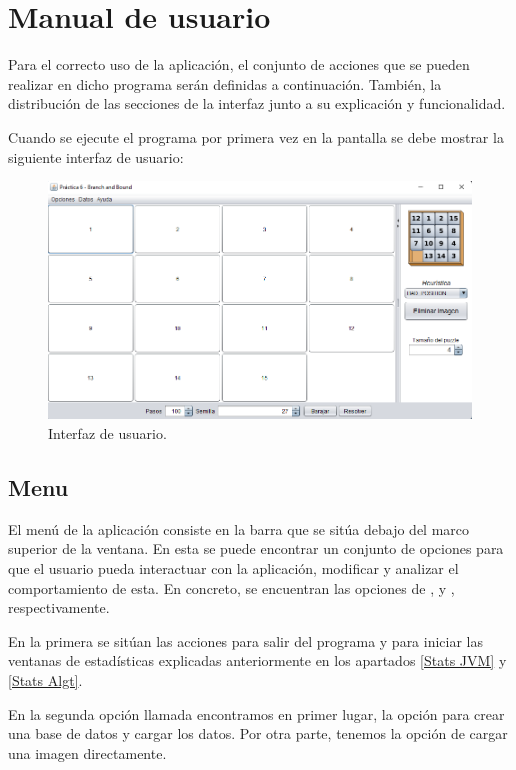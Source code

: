 \section{Manual de usuario}\label{Manual usuario}

Para el correcto uso de la aplicación, el conjunto de acciones que se pueden realizar en dicho programa serán definidas a continuación. También, la distribución de las secciones de la interfaz junto a su explicación y funcionalidad.\bigskip

Cuando se ejecute el programa por primera vez en la pantalla se debe mostrar la siguiente interfaz de usuario:

\begin{figure}[!h]
    \centering
    \includegraphics[width=\linewidth]{Usage/img/GUI.png}
    \caption{Interfaz de usuario.}
    \label{fig:User_interface}
\end{figure}

\subsection{Menu}\label{Manual usuario, Header}

El menú de la aplicación consiste en la barra que se sitúa debajo del marco superior de la ventana. En esta se puede encontrar un conjunto de opciones para que el usuario pueda interactuar con la aplicación, modificar y analizar el comportamiento de esta. En concreto, se encuentran las opciones de ,  y , respectivamente.\bigskip

En la primera se sitúan las acciones para salir del programa y para iniciar las ventanas de estadísticas explicadas anteriormente en los apartados \ref{Stats JVM} y \ref{Stats Algt}.\bigskip

En la segunda opción llamada  encontramos en primer lugar, la opción para crear una base de datos y cargar los datos. Por otra parte, tenemos la opción de cargar una imagen directamente.\bigskip

